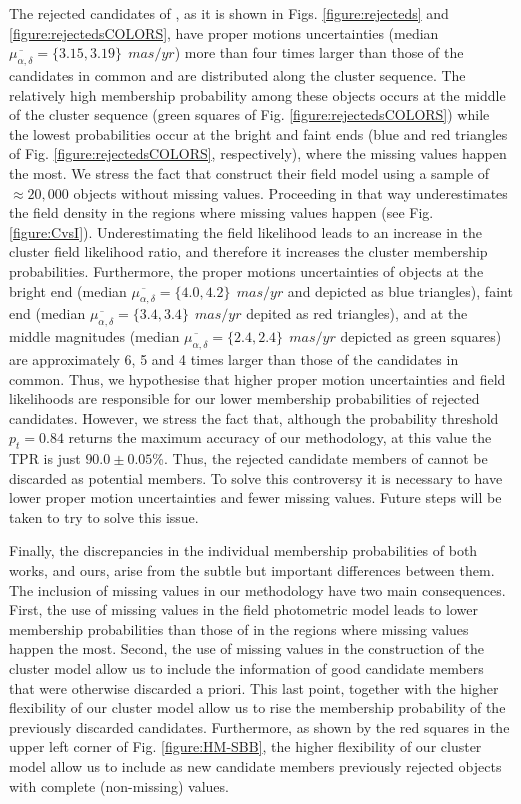 The rejected candidates of \citet{Bouy2015}, as it is shown in Figs. \ref{figure:rejecteds} and \ref{figure:rejectedsCOLORS}, have proper motions uncertainties (median $\overline{\mu_{\alpha,\delta}}=\{3.15,3.19\} \ \ mas/yr$) more than four times larger than those of the candidates in common and are distributed along the cluster sequence. The relatively high membership probability among these objects occurs at the middle of the cluster sequence (green squares of Fig. \ref{figure:rejectedsCOLORS}) while the lowest probabilities occur at the bright and faint ends (blue and red triangles of Fig. \ref{figure:rejectedsCOLORS}, respectively), where the missing values happen the most. We stress the fact that \citet{Bouy2015} construct their field model using a sample of $\approx 20,000$ objects without missing values. Proceeding in that way underestimates the field density in the regions where missing values happen (see Fig. \ref{figure:CvsI}). Underestimating the field likelihood leads to an increase in the cluster field likelihood ratio, and therefore it increases the cluster membership probabilities. Furthermore, the proper motions uncertainties of objects at the bright end (median $\overline{\mu_{\alpha,\delta}}=\{4.0,4.2\} \ \ mas/yr$ and depicted as blue triangles), faint end (median $\overline{\mu_{\alpha,\delta}}=\{3.4,3.4\} \ \ mas/yr$ depited as red triangles), and at the middle magnitudes (median $\overline{\mu_{\alpha,\delta}}=\{2.4,2.4\} \ \ mas/yr$ depicted as green squares) are approximately 6, 5 and 4 times larger than those of the candidates in common. Thus, we hypothesise that higher proper motion uncertainties and field likelihoods are responsible for our lower membership probabilities of  \citet{Bouy2015} rejected candidates. However, we stress the fact that, although the probability threshold $p_t=0.84$ returns the maximum accuracy of our methodology, at this value the TPR is just $90.0\pm0.05$\%. Thus, the rejected candidate members of \citet{Bouy2015} cannot be discarded as potential members. To solve this controversy it is necessary to have lower proper motion uncertainties and fewer missing values. Future steps will be taken to try to solve this issue.

Finally, the discrepancies in the individual membership probabilities of both works, \citet{Bouy2015} and ours, arise from the subtle but important differences between them. The inclusion of missing values in our methodology have two main consequences. First, the use of missing values in the field photometric model leads to lower membership probabilities than those of \citet{Bouy2015} in the regions where missing values happen the most. Second, the use of missing values in the construction of the cluster model allow us to include the information of good candidate members that were otherwise discarded a priori. This last point, together with the higher flexibility of our cluster model allow us to rise the membership probability of the previously discarded candidates. Furthermore, as shown by the red squares in the upper left corner of Fig. \ref{figure:HM-SBB}, the higher flexibility of our cluster model allow us to include as new candidate members previously rejected objects with complete (non-missing) values.  

